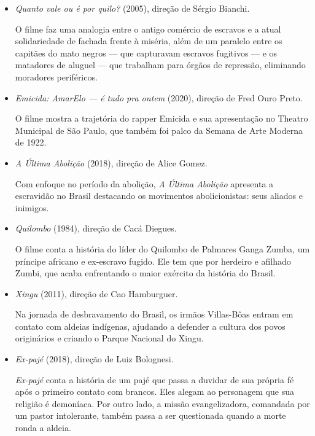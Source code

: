 \documentclass[12pt]{extarticle}
\begin{document}
\begin{itemize}
\item\emph{Quanto vale ou é por quilo?} (2005), direção de Sérgio Bianchi.

O filme faz uma analogia entre o antigo comércio de escravos e 
a atual solidariedade de fachada frente à miséria, além de um paralelo 
entre os capitães do mato negros --- que capturavam escravos 
fugitivos --- e os matadores de aluguel --- que trabalham
para órgãos de repressão, eliminando moradores periféricos.

\item\emph{Emicida: AmarElo --- é tudo pra ontem} (2020), 
direção de Fred Ouro Preto.

O filme mostra a trajetória do rapper Emicida e sua apresentação no 
Theatro Municipal de São Paulo, que também foi palco 
da Semana de Arte Moderna de 1922.

\item\emph{A Última Abolição} (2018), direção de Alice Gomez.

Com enfoque no período da abolição, \emph{A Última Abolição} apresenta 
a escravidão no Brasil destacando os movimentos 
abolicionistas: seus aliados e inimigos.

\item\emph{Quilombo} (1984), direção de Cacá Diegues.

O filme conta a história do líder do Quilombo de Palmares Ganga Zumba, 
um príncipe africano e ex-escravo fugido. Ele tem que por herdeiro e afilhado Zumbi, 
que acaba enfrentando o maior exército da história do Brasil.

\item\emph{Xingu} (2011), direção de Cao Hamburguer.

Na jornada de desbravamento do Brasil, os irmãos Villas-Bôas 
entram em contato com aldeias indígenas, ajudando a defender 
a cultura dos povos originários e criando o Parque Nacional do Xingu.

\item\emph{Ex-pajé} (2018), direção de Luiz Bolognesi.

\emph{Ex-pajé} conta a história de um pajé que passa a duvidar de sua 
própria fé após o primeiro contato com brancos. Eles alegam ao 
personagem que sua religião é demoníaca. Por outro lado, a 
missão evangelizadora, comandada por um pastor intolerante, 
também passa a ser questionada quando a morte ronda a aldeia.

\end{itemize}
\end{document}
